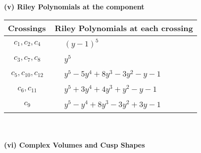 \documentclass[1p]{elsarticle_modified}
\theoremstyle{definition}
\begin{document}
\newpage\renewcommand{\arraystretch}{1}
\flushleft \textbf{(v) Riley Polynomials at the component}\newline \\
\begin{tabular}{m{50pt}|m{274pt}}
Crossings & \hspace{64pt}Riley Polynomials at each crossing \\
\hline $$\begin{aligned}c_{1},c_{2},c_{4}\end{aligned}$$&$\begin{aligned}
&(y-1)^5
\end{aligned}$\\
\hline $$\begin{aligned}c_{3},c_{7},c_{8}\end{aligned}$$&$\begin{aligned}
&y^5
\end{aligned}$\\
\hline $$\begin{aligned}c_{5},c_{10},c_{12}\end{aligned}$$&$\begin{aligned}
&y^5-5 y^4+8 y^3-3 y^2- y-1
\end{aligned}$\\
\hline $$\begin{aligned}c_{6},c_{11}\end{aligned}$$&$\begin{aligned}
&y^5+3 y^4+4 y^3+y^2- y-1
\end{aligned}$\\
\hline $$\begin{aligned}c_{9}\end{aligned}$$&$\begin{aligned}
&y^5- y^4+8 y^3-3 y^2+3 y-1
\end{aligned}$\\
\hline
\end{tabular}\\~\\
\newpage\flushleft \textbf{(vi) Complex Volumes and Cusp Shapes}
\end{document}
